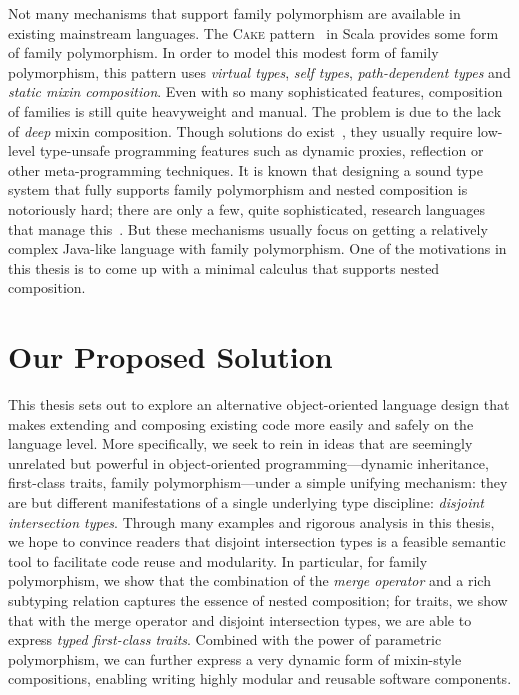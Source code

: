 Not many mechanisms that support family polymorphism are available in existing
mainstream languages. The \textsc{Cake} pattern~\citep{odersky2005scalable,
  Zenger-Odersky2005} in Scala provides some form of family polymorphism. In
order to model this modest form of family polymorphism, this pattern uses
\textit{virtual types}, \textit{self types}, \textit{path-dependent types} and
\textit{static mixin composition}. Even with so many sophisticated features,
composition of families is still quite heavyweight and manual. The problem is
due to the lack of \textit{deep} mixin composition. Though solutions do
exist~\citep{oliveira2013feature}, they usually require low-level type-unsafe
programming features such as dynamic proxies, reflection or other
meta-programming techniques. It is known that designing a sound type system that
fully supports family polymorphism and nested composition is notoriously hard;
there are only a few, quite sophisticated, research languages that manage
this~\citep{ErnstVirtual, Nystrom_2004,
  pubsdoc:tribe-virtual-calculus,SAITO_2007}. But these mechanisms usually focus
on getting a relatively complex Java-like language with family polymorphism. One
of the motivations in this thesis is to come up with a minimal calculus that
supports nested composition.



\section{Our Proposed Solution}

This thesis sets out to explore an alternative object-oriented language design
that makes extending and composing existing code more easily and safely on the
language level. More specifically, we seek to rein in ideas that are seemingly
unrelated but powerful in object-oriented programming---dynamic inheritance,
first-class traits, family polymorphism---under a simple unifying mechanism:
they are but different manifestations of a single underlying type discipline:
\textit{disjoint intersection types}. Through many examples and rigorous
analysis in this thesis, we hope to convince readers that disjoint intersection
types is a feasible semantic tool to facilitate code reuse and modularity. In
particular, for family polymorphism, we show that the combination of the
\textit{merge operator} and a rich subtyping relation captures the essence of
nested composition; for traits, we show that with the merge operator and
disjoint intersection types, we are able to express \textit{typed first-class
  traits}. Combined with the power of parametric polymorphism, we can further
express a very dynamic form of mixin-style compositions, enabling writing highly
modular and reusable software components.

